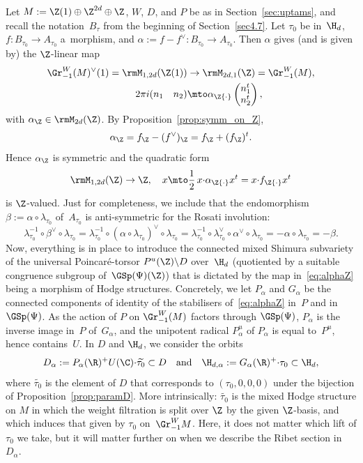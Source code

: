 Let $M:=\Z(1)\oplus\Z^{2d}\oplus\Z$, $W$, $D$, and $P$ be as in
Section~\ref{sec:uptams}, and recall the notation~$B_\tau$ from the
beginning of Section~\ref{sec4.7}.
Let $\tau_0$ be in~$\H_d$, $f\colon B_{\tau_0}\to
A_{\tau_0}$ a~morphism, and $\alpha:=f-f^\vee\colon B_{\tau_0}\to
A_{\tau_0}$. Then $\alpha$ gives (and is given by) the $\Z$-linear map
\begin{equation}\label{eq:alphaZ}
\begin{aligned}
\Gr^W_{-1}(M)^\vee(1) = \rmM_{1,2d}(\Z(1)) & \to \rmM_{2d,1}(\Z)
= \Gr^W_{-1} (M),\\
2\pi i (\begin{matrix} n_1 & n_2\end{matrix}) & \mto
\alpha_\Z{\cdot}\begin{pmatrix} n_1^t\\ n_2^t\end{pmatrix},
\end{aligned}
\end{equation}
with $\alpha_\Z \in\rmM_{2d}(\Z)$.
By Proposition~\ref{prop:symm_on_Z},
\[
\alpha_\Z = f_\Z -(f^\vee)_\Z = f_\Z +(f_\Z)^t.
\]
Hence $\alpha_\Z$ is symmetric and the quadratic form
\[
\rmM_{1,2d}(\Z) \to \Z,\quad
x\mto \frac{1}{2}\,x{\cdot}\alpha_\Z{\cdot}x^t = x{\cdot}f_\Z{\cdot}x^t
\]
is $\Z$-valued. Just for completeness, we include that the
endomorphism $\beta:=\alpha\circ \lambda_{\tau_0}$ of~$A_{\tau_0}$ is
anti-symmetric for the Rosati involution:
\[
\lambda_{\tau_0}^{-1}\circ \beta^\vee \circ \lambda_{\tau_0} =
\lambda_{\tau_0}^{-1}\circ (\alpha\circ \lambda_{\tau_0})^\vee \circ
\lambda_{\tau_0} =
\lambda_{\tau_0}^{-1}\circ \lambda_{\tau_0}^\vee\circ\alpha^\vee \circ
\lambda_{\tau_0} = -\alpha \circ \lambda_{\tau_0} =-\beta.
\]
Now, everything is in place to introduce the connected mixed Shimura
subvariety of the universal Poincaré-torsor $P^u(\Z)\backslash D$
over~$\H_d$ (quotiented by a suitable congruence subgroup
of~$\GSp(\Psi)(\Z)$) that is dictated by the map in~\eqref{eq:alphaZ}
being a morphism of Hodge structures. Concretely, we let $P_\alpha$
and $G_\alpha$ be the connected components of identity of the
stabilisers of~\eqref{eq:alphaZ} in~$P$ and in~$\GSp(\Psi)$. As the
action of $P$ on $\Gr^W_{-1}(M)$ factors through $\GSp(\Psi)$,
$P_\alpha$ is the inverse image in~$P$ of~$G_\alpha$, and the
unipotent radical $P_\alpha^u$ of $P_\alpha$ is equal to~$P^u$, hence
contains~$U$. In $D$ and $\H_d$, we consider the orbits
\begin{equation}\label{eq:Dalpha}
D_\alpha:=P_\alpha(\R)^+U(\C){\cdot}\widetilde{\tau_0} \subset D
\quad\text{and}\quad
\H_{d,\alpha}:=G_\alpha(\R)^+{\cdot}\tau_0 \subset \H_d ,
\end{equation}
where $\widetilde{\tau_0}$ is the element of $D$ that corresponds to
$(\tau_0,0,0,0)$ under the bijection of
Proposition~\ref{prop:paramD}. More intrinsically:
$\widetilde{\tau_0}$ is the mixed Hodge structure on $M$ in which the
weight filtration is split over $\Z$ by the given $\Z$-basis, and
which induces that given by $\tau_0$ on~$\Gr^W_{-1}M$. Here, it does
not matter which lift of $\tau_0$ we take, but it will matter further
on when we describe the Ribet section in~$D_\alpha$.

